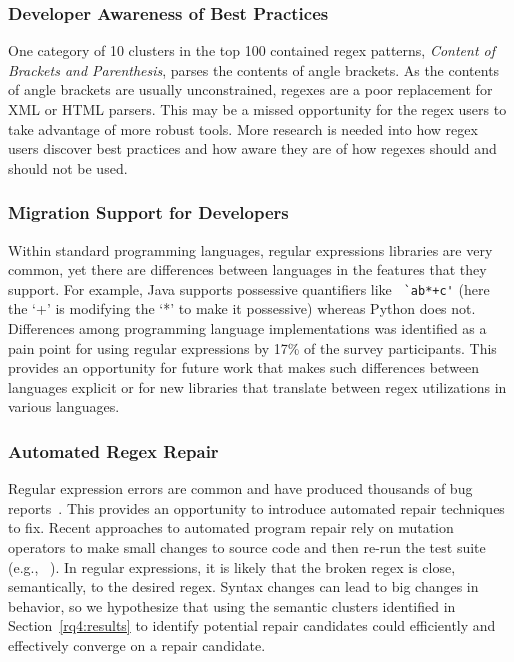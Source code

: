 \subsubsection{Developer Awareness of Best Practices}
One category of 10 clusters in the top 100 contained regex patterns, \emph{Content of Brackets and Parenthesis}, parses the contents of angle brackets.  As the contents of angle brackets are usually unconstrained, regexes are a poor replacement for XML or HTML parsers.  This may be a missed opportunity for the regex users to take advantage of more robust tools. More research is needed into how regex users discover best practices and how aware they are of how regexes should and should not be used.

\subsubsection{Migration  Support for Developers}
Within standard programming languages, regular expressions libraries are very common, yet there are  differences between languages in the features that they support. For example, Java supports possessive quantifiers like \verb! `ab*+c'! (here the `+' is modifying the `*' to make it possessive) whereas Python does not. Differences among programming language implementations was identified as a pain point for using regular expressions by 17\% of the survey participants. This provides an opportunity for future work that makes such differences between languages explicit or for new libraries that translate between regex utilizations in various languages.


\subsubsection{Automated Regex Repair}
Regular expression errors are common and have produced thousands of bug reports~\cite{Spishak:2012:TSR:2318202.2318207}. This provides an opportunity to introduce automated repair techniques to fix.
Recent approaches to automated program repair rely on mutation operators to make small changes to source code and then re-run the test suite (e.g., ~\cite{cacm10, genprog-tse-journal}). In regular expressions, it is likely that the broken regex is close, semantically, to the desired regex. Syntax changes can lead to big changes in behavior, so we hypothesize that using the semantic clusters identified in Section~\ref{rq4:results} to identify potential repair candidates could efficiently and effectively converge on a repair candidate.

